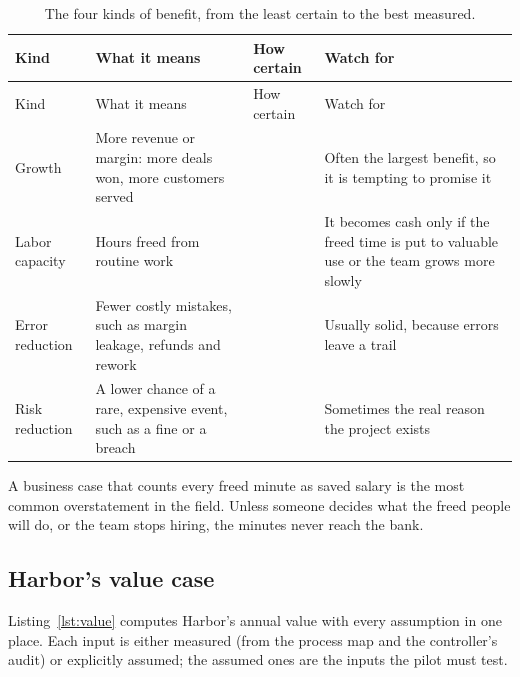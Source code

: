 \begingroup
\small
\begin{xltabular}{\textwidth}{@{}>{\raggedright\arraybackslash}p{2.4cm}>{\raggedright\arraybackslash}X>{\raggedright\arraybackslash}p{2.3cm}>{\raggedright\arraybackslash}X@{}}
\caption{The four kinds of benefit, from the least certain to the best measured.}\label{tab:benefits}\\
\toprule
{} Kind & What it means & How certain & Watch for \\
\midrule
\endfirsthead
\toprule
{} Kind & What it means & How certain & Watch for \\
\midrule
\endhead
Growth & More revenue or margin: more deals won, more customers served &  & Often the largest benefit, so it is tempting to promise it \\
Labor capacity & Hours freed from routine work &  & It becomes cash only if the freed time is put to valuable use or the team grows more slowly \\
Error reduction & Fewer costly mistakes, such as margin leakage, refunds and rework &  & Usually solid, because errors leave a trail \\
Risk reduction & A lower chance of a rare, expensive event, such as a fine or a breach &  & Sometimes the real reason the project exists \\
\bottomrule
\end{xltabular}
\endgroup

\begin{watchout}
A business case that counts every freed minute as saved salary is the most common overstatement in the field. Unless someone decides what the freed people will do, or the team stops hiring, the minutes never reach the bank.
\end{watchout}

\subsection{Harbor's value case}

Listing~\ref{lst:value} computes Harbor's annual value with every assumption in one place. Each input is either measured (from the process map and the controller's audit) or explicitly assumed; the assumed ones are the inputs the pilot must test.




